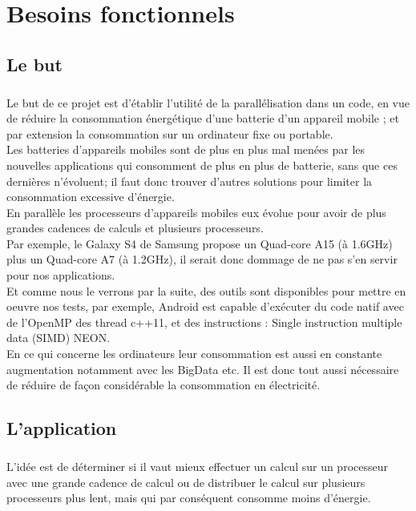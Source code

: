 \chapter{Besoins fonctionnels}

\section{Le but}
\paragraph{}
	Le but de ce projet est d'établir l'utilité de la parallélisation dans un code, en vue de réduire la consommation énergétique d'une batterie d'un appareil mobile ; et par extension la consommation sur un ordinateur fixe ou portable. \\

	Les batteries d'appareils mobiles sont de plus en plus mal menées par les nouvelles applications qui consomment de plus en plus de batterie, sans que ces dernières n'évoluent; il faut donc trouver d'autres solutions pour limiter la consommation excessive d'énergie.\\

	En parallèle les processeurs d'appareils mobiles eux évolue pour avoir de plus grandes cadences de calculs et plusieurs processeurs.\\

	Par exemple, le Galaxy S4 de Samsung propose un Quad-core A15 (à 1.6GHz) plus un Quad-core A7 (à 1.2GHz), il serait donc dommage de ne pas s'en servir pour nos applications.\\

	Et comme nous le verrons par la suite, des outils sont disponibles pour mettre en oeuvre nos tests, par exemple, Android est capable d'exécuter du code natif avec de l'OpenMP des thread c++11, et des instructions : Single instruction multiple data (SIMD) NEON. \\

	En ce qui concerne les ordinateurs leur consommation est aussi en constante augmentation notamment avec les BigData etc. Il est donc tout aussi nécessaire de réduire de façon considérable la consommation en électricité.

\section{L'application}
\paragraph{}
	L'idée est de déterminer si il vaut mieux effectuer un calcul sur un processeur avec une grande cadence de calcul ou de distribuer le calcul sur plusieurs processeurs plus lent, mais qui par conséquent consomme moins d'énergie. \\


